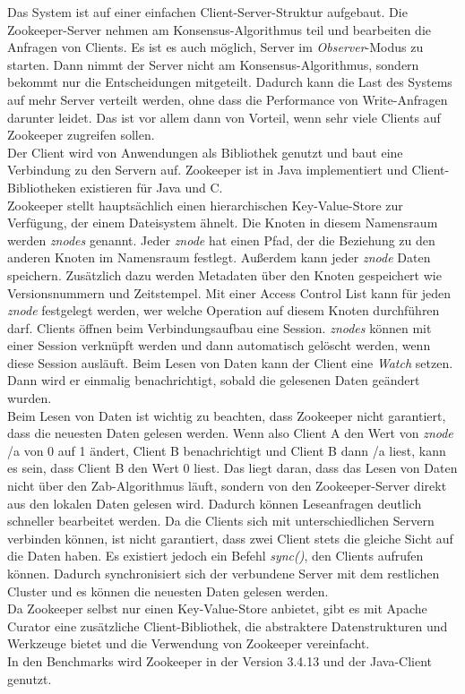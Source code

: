 Das System ist auf einer einfachen Client-Server-Struktur aufgebaut. Die Zookeeper-Server nehmen am Konsensus-Algorithmus teil und bearbeiten die Anfragen von Clients. Es ist es auch möglich, Server im \textit{Observer}-Modus zu starten. Dann nimmt der Server nicht am Konsensus-Algorithmus, sondern bekommt nur die Entscheidungen mitgeteilt. Dadurch kann die Last des Systems auf mehr Server verteilt werden, ohne dass die Performance von Write-Anfragen darunter leidet. Das ist vor allem dann von Vorteil, wenn sehr viele Clients auf Zookeeper zugreifen sollen. \\
Der Client wird von Anwendungen als Bibliothek genutzt und baut eine Verbindung zu den Servern auf. Zookeeper ist in Java implementiert und Client-Bibliotheken existieren für Java und C. \\
Zookeeper stellt hauptsächlich einen hierarchischen Key-Value-Store zur Verfügung, der einem Dateisystem ähnelt. Die Knoten in diesem Namensraum werden \textit{znodes} genannt. Jeder \textit{znode} hat einen Pfad, der die Beziehung zu den anderen Knoten im Namensraum festlegt. Außerdem kann jeder \textit{znode} Daten speichern. Zusätzlich dazu werden Metadaten über den Knoten gespeichert wie Versionsnummern und Zeitstempel. Mit einer Access Control List kann für jeden \textit{znode} festgelegt werden, wer welche Operation auf diesem Knoten durchführen darf. Clients öffnen beim Verbindungsaufbau eine Session. \textit{znodes} können mit einer Session verknüpft werden und dann automatisch gelöscht werden, wenn diese Session ausläuft. Beim Lesen von Daten kann der Client eine \textit{Watch} setzen. Dann wird er einmalig benachrichtigt, sobald die gelesenen Daten geändert wurden.\\
Beim Lesen von Daten ist wichtig zu beachten, dass Zookeeper nicht garantiert, dass die neuesten Daten gelesen werden. Wenn also Client A den Wert von \textit{znode} /a von 0 auf 1 ändert, Client B benachrichtigt und Client B dann /a liest, kann es sein, dass Client B den Wert 0 liest. Das liegt daran, dass das Lesen von Daten nicht über den Zab-Algorithmus läuft, sondern von den Zookeeper-Server direkt aus den lokalen Daten gelesen wird. Dadurch können Leseanfragen deutlich schneller bearbeitet werden. Da die Clients sich mit unterschiedlichen Servern verbinden können, ist nicht garantiert, dass zwei Client stets die gleiche Sicht auf die Daten haben. Es existiert jedoch ein Befehl \textit{sync()}, den Clients aufrufen können. Dadurch synchronisiert sich der verbundene Server mit dem restlichen Cluster und es können die neuesten Daten gelesen werden. \\
Da Zookeeper selbst nur einen Key-Value-Store anbietet, gibt es mit Apache Curator \cite{curator} eine zusätzliche Client-Bibliothek, die abstraktere Datenstrukturen und Werkzeuge bietet und die Verwendung von Zookeeper vereinfacht. \\
In den Benchmarks wird Zookeeper in der Version 3.4.13 und der Java-Client genutzt.

